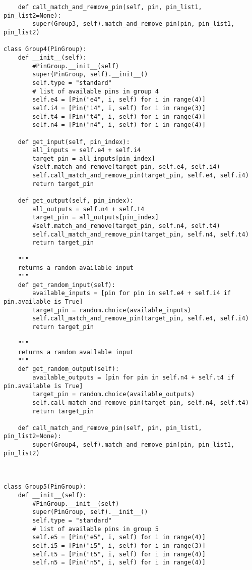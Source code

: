\documentclass[a4paper]{article}
\begin{document}
\begin{verbatim}
    def call_match_and_remove_pin(self, pin, pin_list1, pin_list2=None):
        super(Group3, self).match_and_remove_pin(pin, pin_list1, pin_list2)

class Group4(PinGroup):
    def __init__(self):
        #PinGroup.__init__(self)
        super(PinGroup, self).__init__()
        self.type = "standard"
        # list of available pins in group 4
        self.e4 = [Pin("e4", i, self) for i in range(4)]
        self.i4 = [Pin("i4", i, self) for i in range(3)]
        self.t4 = [Pin("t4", i, self) for i in range(4)]
        self.n4 = [Pin("n4", i, self) for i in range(4)]

    def get_input(self, pin_index):
        all_inputs = self.e4 + self.i4
        target_pin = all_inputs[pin_index]
        #self.match_and_remove(target_pin, self.e4, self.i4)
        self.call_match_and_remove_pin(target_pin, self.e4, self.i4)
        return target_pin

    def get_output(self, pin_index):
        all_outputs = self.n4 + self.t4
        target_pin = all_outputs[pin_index]
        #self.match_and_remove(target_pin, self.n4, self.t4)
        self.call_match_and_remove_pin(target_pin, self.n4, self.t4)
        return target_pin

    """
    returns a random available input
    """
    def get_random_input(self):
        available_inputs = [pin for pin in self.e4 + self.i4 if pin.available is True]
        target_pin = random.choice(available_inputs)
        self.call_match_and_remove_pin(target_pin, self.e4, self.i4)
        return target_pin

    """
    returns a random available input
    """
    def get_random_output(self):
        available_outputs = [pin for pin in self.n4 + self.t4 if pin.available is True]
        target_pin = random.choice(available_outputs)
        self.call_match_and_remove_pin(target_pin, self.n4, self.t4)
        return target_pin

    def call_match_and_remove_pin(self, pin, pin_list1, pin_list2=None):
        super(Group4, self).match_and_remove_pin(pin, pin_list1, pin_list2)



class Group5(PinGroup):
    def __init__(self):
        #PinGroup.__init__(self)
        super(PinGroup, self).__init__()
        self.type = "standard"
        # list of available pins in group 5
        self.e5 = [Pin("e5", i, self) for i in range(4)]
        self.i5 = [Pin("i5", i, self) for i in range(3)]
        self.t5 = [Pin("t5", i, self) for i in range(4)]
        self.n5 = [Pin("n5", i, self) for i in range(4)]


\end{verbatim}
\end{document}

